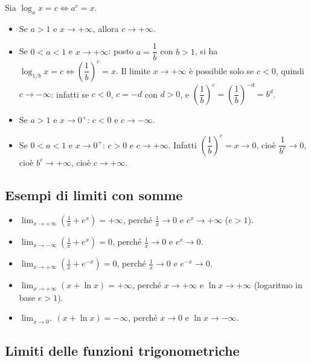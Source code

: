 \documentclass[11pt,a4paper]{article}
\begin{document}
\begin{esempio}
Sia $\log_a x = c \iff a^c = x$.
\begin{itemize}
  \item Se $a > 1$ e $x \to +\infty$, allora $c \to +\infty$.
  \item Se $0 < a < 1$ e $x \to +\infty$: posto $a = \dfrac{1}{b}$ con $b > 1$, si ha $\log_{1/b} x = c \iff \left(\dfrac{1}{b}\right)^c = x$. Il limite $x \to +\infty$ è possibile solo se $c < 0$, quindi $c \to -\infty$: infatti se $c < 0$, $c = -d$ con $d > 0$, e $\left(\dfrac{1}{b}\right)^c = \left(\dfrac{1}{b}\right)^{-d} = b^d$.
  \item Se $a > 1$ e $x \to 0^+$: $c < 0$ e $c \to -\infty$.
  \item Se $0 < a < 1$ e $x \to 0^+$: $c > 0$ e $c \to +\infty$. Infatti $\left(\dfrac{1}{b}\right)^c = x \to 0$, cioè $\dfrac{1}{b^c} \to 0$, cioè $b^c \to +\infty$, cioè $c \to +\infty$.
\end{itemize}
\end{esempio}

\subsection{Esempi di limiti con somme}

\begin{esempio}
\begin{itemize}
  \item $\displaystyle\lim_{x\to+\infty}\left(\frac{1}{x} + e^x\right) = +\infty$, perché $\frac{1}{x} \to 0$ e $e^x \to +\infty$ ($e > 1$).
  \item $\displaystyle\lim_{x\to-\infty}\left(\frac{1}{x} + e^x\right) = 0$, perché $\frac{1}{x} \to 0$ e $e^x \to 0$.
  \item $\displaystyle\lim_{x\to+\infty}\left(\frac{1}{x} + e^{-x}\right) = 0$, perché $\frac{1}{x} \to 0$ e $e^{-x} \to 0$.
  \item $\displaystyle\lim_{x\to+\infty}\left(x + \ln x\right) = +\infty$, perché $x \to +\infty$ e $\ln x \to +\infty$ (logaritmo in base $e > 1$).
  \item $\displaystyle\lim_{x\to 0^+}\left(x + \ln x\right) = -\infty$, perché $x \to 0$ e $\ln x \to -\infty$.
\end{itemize}
\end{esempio}

\subsection{Limiti delle funzioni trigonometriche}
\end{document}
